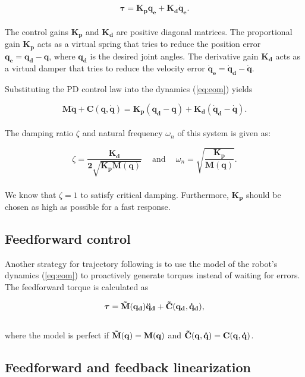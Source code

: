 \begin{equation}\label{eq:pd}
    \boldsymbol{\tau} = \mathbf{K_p q_e + K_d \dot{q}_e}.
\end{equation}
\\
The control gains $\mathbf{K_p}$ and $\mathbf{K_d}$ are positive diagonal matrices. The proportional gain $\mathbf{K_p}$ acts as a virtual spring that tries to reduce the position error $\mathbf{q_e = q_d - q}$, where $\mathbf{q_d}$ is the desired joint angles. The derivative gain $\mathbf{K_d}$ acts as a virtual damper that tries to reduce the velocity error $\mathbf{\dot{q}_e = \dot{q}_d - \dot{q}}$.

Substituting the PD control law into the dynamics (\ref{eq:eom}) yields

\begin{equation}\label{eq:control1}
    \mathbf{M \ddot{q} + C(q, \dot{q}) = K_p (q_d - q) + K_d (\dot{q}_d - \dot{q})}.
\end{equation}
\\
The damping ratio $\zeta$ and natural frequency $\omega_n$ of this system is given as:

\begin{equation}\label{eq:control2}
    \zeta = \mathbf{\frac{K_d}{2 \sqrt{K_p M(q)}}} \quad  \
    \textrm{and} \quad \
    \omega_n = \mathbf{\sqrt{\frac{K_p}{M(q)}}}.
\end{equation}
\\
We know that $\zeta = 1$ to satisfy critical damping. Furthermore, $\mathbf{K_p}$ should be chosen as high as possible for a fast response.

\subsection{Feedforward control}
Another strategy for trajectory following is to use the model of the robot's dynamics (\ref{eq:eom}) to proactively generate torques instead of waiting for errors. The feedforward torque is calculated as 

\begin{equation}\label{eq:feedforward}
    \boldsymbol{\tau} = \mathbf{\Tilde{M}(q_d)\ddot{q}_d + \Tilde{C}(q_d, \dot{q}_d)},
\end{equation}
\\
where the model is perfect if $\mathbf{\Tilde{M}(q) = M(q)}$ and $\mathbf{\Tilde{C}(q,\dot{q}) = C(q,\dot{q})}$.


\subsection{Feedforward and feedback linearization} \label{subsec:comp_torque}


